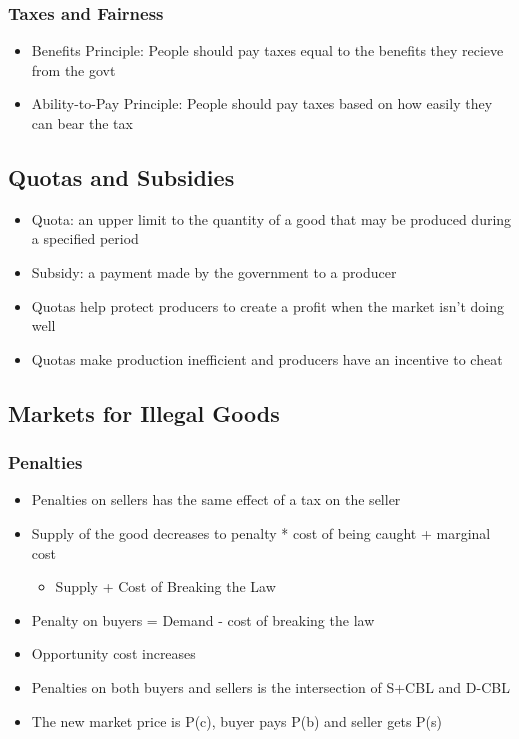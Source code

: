 \documentclass[11pt]{article}
\begin{document}
\subsubsection{Taxes and Fairness}
\label{sec:org6d13155}
\begin{itemize}
\item Benefits Principle: People should pay taxes equal to the benefits they recieve from the govt
\item Ability-to-Pay Principle: People should pay taxes based on how easily they can bear the tax
\end{itemize}
\subsection{Quotas and Subsidies}
\label{sec:org4e65861}
\begin{itemize}
\item Quota: an upper limit to the quantity of a good that may be produced during a specified period
\item Subsidy: a payment made by the government to a producer
\item Quotas help protect producers to create a profit when the market isn't doing well
\item Quotas make production inefficient and producers have an incentive to cheat
\end{itemize}
\subsection{Markets for Illegal Goods}
\label{sec:org8aac328}
\subsubsection{Penalties}
\label{sec:orgeaae45d}
\begin{itemize}
\item Penalties on sellers has the same effect of a tax on the seller
\item Supply of the good decreases to penalty * cost of being caught + marginal cost 
\begin{itemize}
\item Supply + Cost of Breaking the Law
\end{itemize}
\item Penalty on buyers = Demand - cost of breaking the law
\item Opportunity cost increases
\item Penalties on both buyers and sellers is the intersection of S+CBL and D-CBL
\item The new market price is P(c), buyer pays P(b) and seller gets P(s)
\end{itemize}
\end{document}
